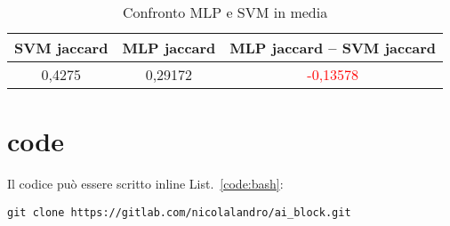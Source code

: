 \begin {table}[H]
\caption {Confronto MLP e SVM in media} \label{tab:mlp} 
\begin{center}
\begin{tabular}{|c|c|c|}
  
  \hline
  \rowcolor[gray]{.6}
  \textbf{SVM jaccard} & \textbf{MLP jaccard} & \textbf{MLP jaccard – SVM jaccard} \\
  
  \hline
  \rowcolor[gray]{.8}
  0,4275 & 0,29172 & \textcolor{red}{-0,13578}\\
  \hline
\end{tabular} 
\end{center}
\end{table}

\section{code}

Il codice può essere scritto inline List.~\ref{code:bash}:
\begin{lstlisting}[language=DebianBash, style=basic, label=code:bash, caption=sample bash]
git clone https://gitlab.com/nicolalandro/ai_block.git
\end{lstlisting}

